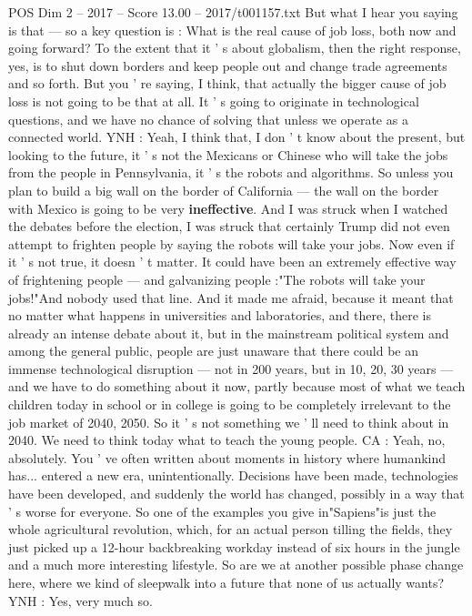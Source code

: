\begin{textsample}{POS Dim 2 – 2017 – Score 13.00 – 2017/t001157.txt}
But what I hear you saying is that — so a key question is : What is the real cause of job loss, both now and going forward?
To the extent that it ' s about globalism, then the right response, yes, is to shut down borders and keep people out and change trade agreements and so forth.
But you ' re saying, I think, that actually the bigger cause of job loss is not going to be that at all.
It ' s going to originate in technological questions, and we have no chance of solving that unless we operate as a connected world.
YNH : Yeah, I think that, I don ' t know about the present, but looking to the future, it ' s not the Mexicans or Chinese who will take the jobs from the people in Pennsylvania, it ' s the robots and algorithms.
So unless you plan to build a big wall on the border of California — the wall on the border with Mexico is going to be very \textbf{ineffective}.
And I was struck when I watched the debates before the election, I was struck that certainly Trump did not even attempt to frighten people by saying the robots will take your jobs.
Now even if it ' s not true, it doesn ' t matter.
It could have been an extremely effective way of frightening people — and galvanizing people :"The robots will take your jobs!"And nobody used that line.
And it made me afraid, because it meant that no matter what happens in universities and laboratories, and there, there is already an intense debate about it, but in the mainstream political system and among the general public, people are just unaware that there could be an immense technological disruption — not in 200 years, but in 10, 20, 30 years — and we have to do something about it now, partly because most of what we teach children today in school or in college is going to be completely irrelevant to the job market of 2040, 2050.
So it ' s not something we ' ll need to think about in 2040.
We need to think today what to teach the young people.
CA : Yeah, no, absolutely.
You ' ve often written about moments in history where humankind has... entered a new era, unintentionally.
Decisions have been made, technologies have been developed, and suddenly the world has changed, possibly in a way that ' s worse for everyone.
So one of the examples you give in"Sapiens"is just the whole agricultural revolution, which, for an actual person tilling the fields, they just picked up a 12-hour backbreaking workday instead of six hours in the jungle and a much more interesting lifestyle.
So are we at another possible phase change here, where we kind of sleepwalk into a future that none of us actually wants?
YNH : Yes, very much so.

\end{textsample}

